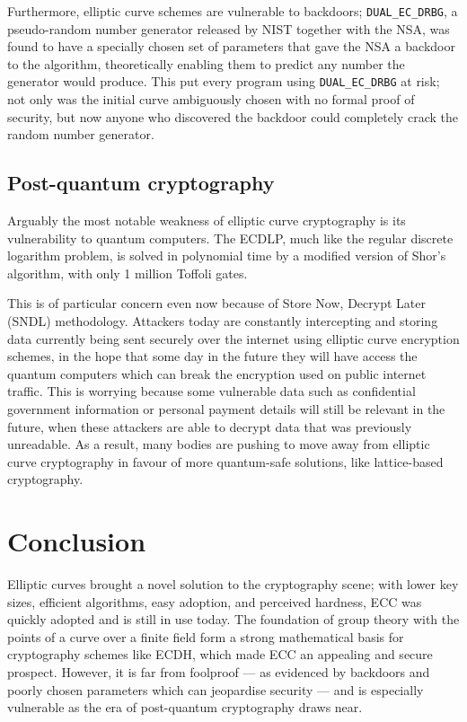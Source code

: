 \documentclass[a4paper]{article}
\begin{document}
Furthermore, elliptic curve schemes are vulnerable to backdoors; \texttt{DUAL\_EC\_DRBG}, a pseudo-random number generator released by NIST together with the NSA, was found to have a specially chosen set of parameters that gave the NSA a backdoor to the algorithm, theoretically enabling them to predict any number the generator would produce.\cite{blog} This put every program using \texttt{DUAL\_EC\_DRBG} at risk; not only was the initial curve ambiguously chosen with no formal proof of security, but now anyone who discovered the backdoor could completely crack the random number generator.

\subsection{Post-quantum cryptography}

Arguably the most notable weakness of elliptic curve cryptography is its vulnerability to quantum computers. The ECDLP, much like the regular discrete logarithm problem, is solved in polynomial time by a modified version of Shor's algorithm, with only 1 million Toffoli gates.\cite{gates} 

This is of particular concern even now because of Store Now, Decrypt Later (SNDL) methodology. Attackers today are constantly intercepting and storing data currently being sent securely over the internet using elliptic curve encryption schemes, in the hope that some day in the future they will have access the quantum computers which can break the encryption used on public internet traffic.\cite{jstor} This is worrying because some vulnerable data such as confidential government information or personal payment details will still be relevant in the future, when these attackers are able to decrypt data that was previously unreadable. As a result, many bodies are pushing to move away from elliptic curve cryptography in favour of more quantum-safe solutions,\cite{aes} like lattice-based cryptography.\cite{nist}


\section{Conclusion}

Elliptic curves brought a novel solution to the cryptography scene; with lower key sizes, efficient algorithms, easy adoption, and perceived hardness, ECC was quickly adopted and is still in use today. The foundation of group theory with the points of a curve over a finite field form a strong mathematical basis for cryptography schemes like ECDH, which made ECC an appealing and secure prospect. However, it is far from foolproof --- as evidenced by backdoors and poorly chosen parameters which can jeopardise security --- and is especially vulnerable as the era of post-quantum cryptography draws near.
\end{document}
